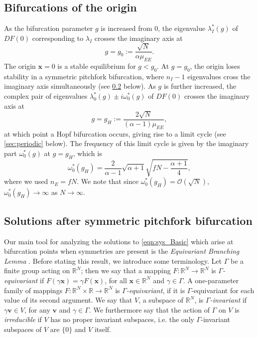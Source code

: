 \documentclass[reqno]{siamonline190516}
\newcommand{\vvec}{\mathbf{v}}
\newcommand{\xvec}{\mathbf{x}}
\begin{document}
\subsection{Bifurcations of the origin}\label{sec:biforigin}

As the bifurcation parameter $g$ is increased from 0, the eigenvalue $\lambda_I^*(g)$ of $DF(0)$ corresponding to $\lambda_I$ crosses the imaginary axis at
\begin{equation}\label{eq:pitchlocation}
    g = g_0 := \frac{\sqrt{N}}{\alpha \mu_{EE}}.
\end{equation}
The origin $\xvec = 0$ is a stable equilibrium for $g < g_0$. At $g=g_0$, the origin loses stability in a symmetric pitchfork bifurcation, where $n_I - 1$ eigenvalues cross the imaginary axis simultaneously (see \cref{sec:symmpitch} below). As $g$ is further increased, the complex pair of eigenvalues $\lambda^*_0(g) \pm i \omega^*_0(g)$ of $DF(0)$ crosses the imaginary axis at 
\begin{equation}\label{eq:0hopflocation}
    g = g_H := \frac{ 2\sqrt{N} }{ (\alpha-1)\mu_{EE} },
\end{equation}
at which point a Hopf bifurcation occurs, giving rise to a limit cycle (see \cref{sec:periodic} below). The frequency of this limit cycle is given by the imaginary part $\omega^*_0(g)$ at $g = g_H$, which is
\begin{equation}\label{eq:omegag}
\omega^*_0(g_H) = \frac{2}{\alpha-1}\sqrt{\alpha+1}\sqrt{f N- \frac{\alpha+1}{4}}, 
\end{equation}
where we used $n_E = f N$. We note that since $\omega^*_0(g_H) = \mathcal{O}(\sqrt{N})$, $\omega^*_0(g_H) \rightarrow \infty$ as $N \rightarrow \infty$. 

\subsection{Solutions after symmetric pitchfork bifurcation}\label{sec:symmpitch}

Our main tool for analyzing the solutions to \cref{eqn:sys_Basic} which arise at bifurcation points when symmetries are present is the \emph{Equivariant Branching Lemma} \cite{MR631456,GSS88Vol2,HoyleRebeccaB2006Pf:a}. Before stating this result, we introduce some terminology. Let $\Gamma$ be a finite group acting on $\mathbb{R}^N$; then we say that a mapping $F: \mathbb{R}^N  \rightarrow \mathbb{R}^N$ is \emph{$\Gamma$-equivariant} if $F(\gamma \xvec) = \gamma F(\xvec)$, for all $\xvec \in \mathbb{R}^N$ and $\gamma \in \Gamma$.  A one-parameter family of mappings $F: \mathbb{R}^N \times \mathbb{R}  \rightarrow \mathbb{R}^N$ is \emph{$\Gamma$-equivariant}, if it is $\Gamma$-equivariant for each value of its second argument. We say that $V$, a subspace of $\mathbb{R}^N$, is \emph{$\Gamma$-invariant} if $\gamma \vvec \in V$, for any $\vvec$ and $\gamma \in \Gamma$. We furthermore say that the action of $\Gamma$ on $V$ is \emph{irreducible} if $V$ has no proper invariant subspaces, i.e. the only $\Gamma$-invariant subspaces of $V$ are $\{0\}$ and $V$ itself. 
\end{document}
